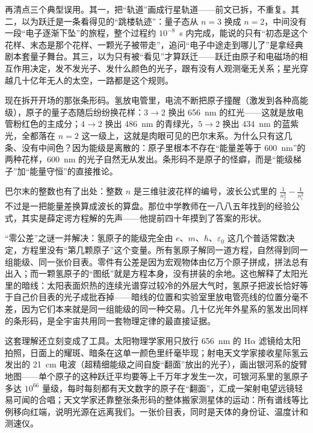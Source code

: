 再清点三个典型误用。其一，把“轨道”画成行星轨道——前文已拆，不重复。其二，以为跃迁是一条看得见的“跳楼轨迹”：量子态从 \(n=3\) 换成 \(n=2\)，中间没有一段“电子逐渐下坠”的旅程，整个过程约 \(10^{-8}\)~s 内完成，能说的只有“初态是这个花样、末态是那个花样、一颗光子被带走”，追问“电子中途走到哪儿了”是拿经典剧本套量子舞台。其三，以为只有被“看见”才算跃迁——跃迁由原子和电磁场的相互作用决定，发不发光子、发什么颜色的光子，跟有没有人观测毫无关系；星光穿越几十亿年无人的太空，一路都是这个规则。


现在拆开开场的那张条形码。氢放电管里，电流不断把原子撞醒（激发到各种高能级），原子的量子态随后纷纷换花样：\(3\to2\) 换出 656~nm 的红光——这就是放电管粉红色的主成分；\(4\to2\) 换出 486~nm 的青绿光，\(5\to2\) 换出 434~nm 的蓝紫光，全都落在 \(n=2\) 这一级上，这就是肉眼可见的巴尔末系。为什么只有这几条、没有中间色？因为能级是离散的：原子里根本不存在“能量差等于 600~nm”的两种花样，600~nm 的光子自然无从发出。条形码不是原子的怪癖，而是“能级梯子”加“能量守恒”的直接推论。

巴尔末的整数也有了出处：整数 \(n\) 是三维驻波花样的编号，波长公式里的 \(\frac{1}{n_f^2}-\frac{1}{n_i^2}\) 不过是一把能量差换算成波长的算盘。那位中学教师在一八八五年找到的经验公式，其实是薛定谔方程解的先声——他提前四十年摸到了答案的形状。

“零公差”之谜一并解决：氢原子的能级完全由 \(e\)、\(m\)、\(\hbar\)、\(\varepsilon_0\) 这几个普适常数决定，方程里没有“第几颗原子”这个变量。所有氢原子解同一道方程，自然得到同一组能级、同一张价目表。零件有公差是因为宏观物体由亿万个原子拼成，拼法总有出入；而一颗氢原子的“图纸”就是方程本身，没有拼装的余地。这也解释了太阳光里的暗线：太阳表面炽热的连续光谱穿过较冷的外层大气时，氢原子把波长恰好等于自己价目表的光子成批吞掉——暗线的位置和实验室里放电管亮线的位置分毫不差，因为它们本来就是同一组能级的同一种交易。几十亿光年外星系的氢发出同样的条形码，是全宇宙共用同一套物理定律的最直接证据。

这套理解还立刻变成了工具。太阳物理学家用只放行 656~nm 的 H\(\alpha\) 滤镜给太阳拍照，日面上的耀斑、暗条在这单一颜色里纤毫毕现；射电天文学家接收星际氢云发出的 21~cm 电波（超精细能级之间自旋“翻面”放出的光子），画出银河系的旋臂地图——单个原子的这种跃迁平均要等上千万年才发生一次，可银河系里的氢原子多达 \(10^{66}\) 量级，每时每刻都有天文数字的原子在“翻面”，汇成一架射电望远镜轻易可闻的合唱；天文学家还靠整张条形码的整体搬家测星体的运动：所有谱线等比例移向红端，说明光源在远离我们。一张价目表，同时是天体的身份证、温度计和测速仪。


